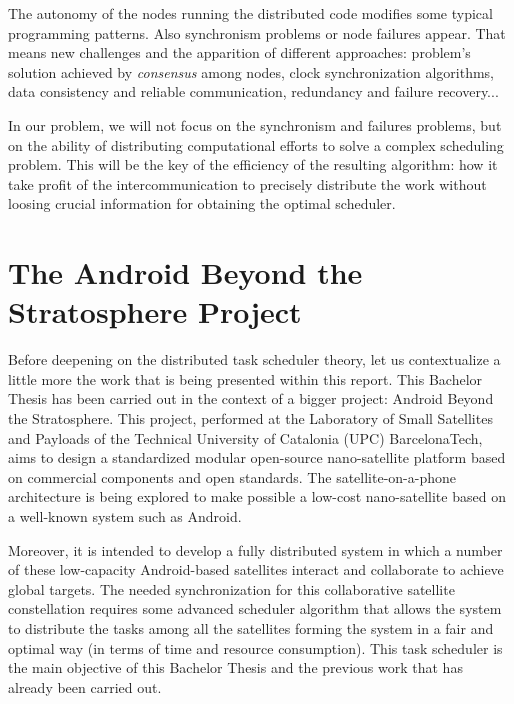 The autonomy of the nodes running the distributed code modifies some typical programming patterns. Also synchronism problems or node failures appear. That means new challenges and the apparition of different approaches: problem's solution achieved by \emph{consensus} among nodes, clock synchronization algorithms, data consistency and reliable communication, redundancy and failure recovery... \citep{Tanenbaum:2006:DSP:1202502}

In our problem, we will not focus on the synchronism and failures problems, but on the ability of distributing computational efforts to solve a complex scheduling problem. This will be the key of the efficiency of the resulting algorithm: how it take profit of the intercommunication to precisely distribute the work without loosing crucial information for obtaining the optimal scheduler.


\section{The Android Beyond the Stratosphere Project}

Before deepening on the distributed task scheduler theory, let us contextualize a little more the work that is being presented within this report. This Bachelor Thesis has been carried out in the context of a bigger project: Android Beyond the Stratosphere. This project, performed at the Laboratory of Small Satellites and Payloads of the Technical University of Catalonia (UPC) BarcelonaTech, aims to design a standardized modular open-source nano-satellite platform based on commercial components and open standards. The satellite-on-a-phone architecture is being explored to make possible a low-cost nano-satellite based on a well-known system such as Android.

Moreover, it is intended to develop a fully distributed system in which a number of these low-capacity Android-based satellites interact and collaborate to achieve global targets. The needed synchronization for this collaborative satellite constellation requires some advanced scheduler algorithm that allows the system to distribute the tasks among all the satellites forming the system in a fair and optimal way (in terms of time and resource consumption). This task scheduler is the main objective of this Bachelor Thesis and the previous work that has already been carried out.

